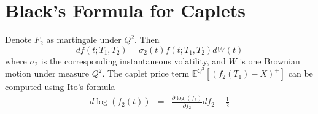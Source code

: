 \chapter{Black's Formula for Caplets}

Denote $F_2$ as martingale under $Q^2$. Then
$$
df(t;T_1,T_2) = \sigma_2(t)f(t;T_1,T_2)dW(t)
$$
where $\sigma_2$ is the corresponding instantaneous volatility, and $W$ is one Brownian motion under measure $Q^2$. The caplet price term $\mathbb{E}^{Q^2}[(f_2(T_1)-X)^+]$ can be computed using Ito's formula
\begin{eqnarray*}
d\log(f_2(t)) &=& \frac{\partial \log(f_2)}{\partial f_2} df_2 + \frac{1}{2}

\end{eqnarray*}  